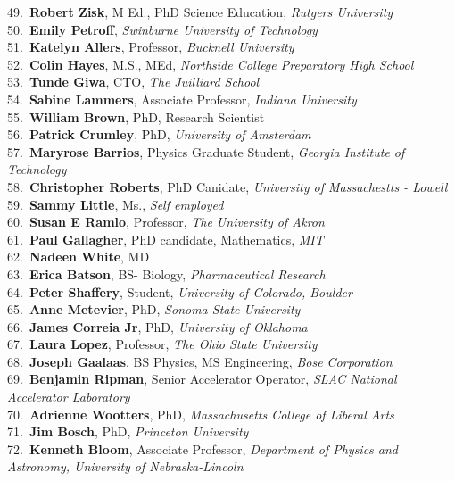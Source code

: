 49.~{\bf Robert Zisk}, M Ed., PhD Science Education, {\sl Rutgers University} \\
50.~{\bf Emily Petroff}, {\sl Swinburne University of Technology} \\
51.~{\bf Katelyn Allers}, Professor, {\sl Bucknell University} \\
52.~{\bf Colin Hayes}, M.S., MEd, {\sl Northside College Preparatory High School} \\
53.~{\bf Tunde Giwa}, CTO, {\sl The Juilliard School} \\
54.~{\bf Sabine Lammers}, Associate Professor, {\sl Indiana University} \\
55.~{\bf William Brown}, PhD, Research Scientist \\
56.~{\bf Patrick Crumley}, PhD, {\sl University of Amsterdam} \\
57.~{\bf Maryrose Barrios}, Physics Graduate Student, {\sl Georgia Institute of Technology } \\
58.~{\bf Christopher Roberts}, PhD Canidate, {\sl University of Massachestts - Lowell} \\
59.~{\bf Sammy Little}, Ms., {\sl Self employed} \\
60.~{\bf Susan E Ramlo}, Professor, {\sl The University of Akron} \\
61.~{\bf Paul Gallagher}, PhD candidate, Mathematics, {\sl MIT} \\
62.~{\bf Nadeen White}, MD \\
63.~{\bf Erica Batson}, BS- Biology, {\sl Pharmaceutical Research } \\
64.~{\bf Peter Shaffery}, Student, {\sl University of Colorado, Boulder} \\
65.~{\bf Anne Metevier}, PhD, {\sl Sonoma State University} \\
66.~{\bf James Correia Jr}, PhD, {\sl University of Oklahoma} \\
67.~{\bf Laura Lopez}, Professor, {\sl The Ohio State University} \\
68.~{\bf Joseph Gaalaas}, BS Physics, MS Engineering, {\sl Bose Corporation} \\
69.~{\bf Benjamin Ripman}, Senior Accelerator Operator, {\sl SLAC National Accelerator Laboratory} \\
70.~{\bf Adrienne Wootters}, PhD, {\sl Massachusetts College of Liberal Arts} \\
71.~{\bf Jim Bosch}, PhD, {\sl Princeton University} \\
72.~{\bf Kenneth Bloom}, Associate Professor, {\sl Department of Physics and Astronomy, University of Nebraska-Lincoln} \\
